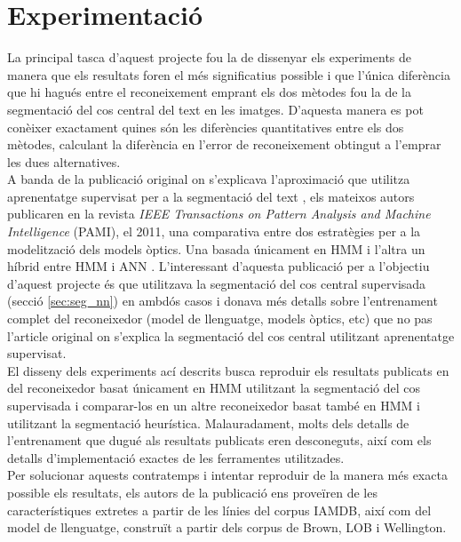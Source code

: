 \chapter{Experimentació} 
\label{cap:exp}
La principal tasca d'aquest projecte fou la de dissenyar els experiments de manera que els resultats foren el més significatius possible i que l'única diferència que hi hagués entre el reconeixement emprant els dos mètodes fou la de la segmentació del cos central del text en les imatges. D'aquesta manera es pot conèixer exactament quines són les diferències quantitatives entre els dos mètodes, calculant la diferència en l'error de reconeixement obtingut a l'emprar les dues alternatives.\\

A banda de la publicació original on s'explicava l'aproximació que utilitza aprenentatge supervisat per a la segmentació del text \cite{DBLP:conf/pris/Gorbe-MoyaEZB08}, els mateixos autors publicaren en la revista \emph{IEEE Transactions on Pattern Analysis and Machine Intelligence} (PAMI), el 2011, una comparativa entre dos estratègies per a la modelització dels models òptics. Una basada únicament en HMM i l'altra un híbrid entre HMM i ANN \cite{espana2011improving}. L'interessant d'aquesta publicació per a l'objectiu d'aquest projecte és que utilitzava la segmentació del cos central supervisada (secció \ref{sec:seg_nn}) en ambdós casos i donava més detalls sobre l'entrenament complet del reconeixedor (model de llenguatge, models òptics, etc) que no pas l'article original on s'explica la segmentació del cos central utilitzant aprenentatge supervisat.\\

El disseny dels experiments ací descrits busca reproduir els resultats publicats en \cite{espana2011improving} del reconeixedor basat únicament en HMM utilitzant la segmentació del cos supervisada i comparar-los en un altre reconeixedor basat també en HMM i utilitzant la segmentació heurística. Malauradament, molts dels detalls de l'entrenament que dugué als resultats publicats eren desconeguts, així com els detalls d'implementació exactes de les ferramentes utilitzades.\\

Per solucionar aquests contratemps i intentar reproduir de la manera més exacta possible els resultats, els autors de la publicació ens proveïren de les característiques extretes a partir de les línies del corpus IAMDB, així com del model de llenguatge, construït a partir dels corpus de Brown, LOB i Wellington.

